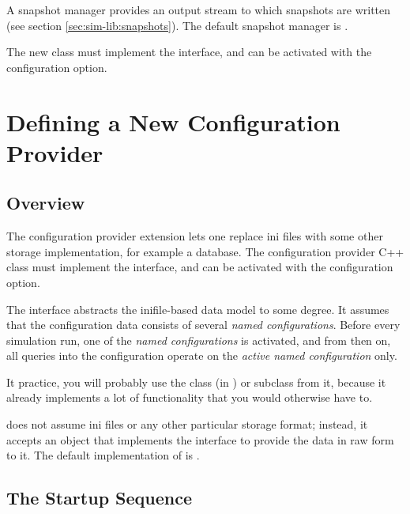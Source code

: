 A snapshot manager provides an output stream to which snapshots are written
(see section \ref{sec:sim-lib:snapshots}). The default snapshot manager
is .

The new class must implement the  interface, and
can be activated with the  configuration
option.


\section{Defining a New Configuration Provider}
\label{sec:plugin-exts:configuration-providers}

\subsection{Overview}
\label{sec:plugin-exts:configprovider-overview}

The configuration provider extension lets one replace ini files
with some other storage implementation, for example a database.
The configuration provider C++ class must implement the
 interface, and can be activated with
the  configuration option.

The  interface abstracts the inifile-based
data model to some degree. It assumes that the configuration data
consists of several \textit{named configurations}. Before every
simulation run, one of the \textit{named configurations} is
activated, and from then on, all queries into the configuration
operate on the \textit{active named configuration} only.

It practice, you will probably use the 
class (in ) or subclass from it, because it already
implements a lot of functionality that you would otherwise have to.

 does not assume ini files or
any other particular storage format; instead, it accepts
an object that implements the 
interface to provide the data in raw form to it.
The default implementation of  is
.

\subsection{The Startup Sequence}
\label{sec:plugin-exts:configprovider-startup-sequence}

